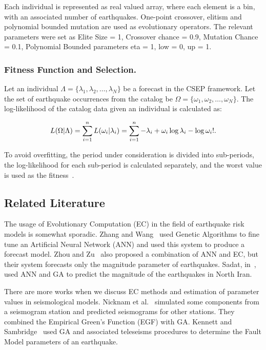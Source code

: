 Each individual is represented as real valued array, where each
element is a bin, with an associated number of earthquakes. One-point
crossover, elitism and polynomial bounded mutation are used as
evolutionary operators. The relevant parameters were set as Elite Size
= 1, Crossover chance = 0.9, Mutation Chance = 0.1, Polynomial Bounded
parameters eta = 1, low = 0, up = 1.


\subsubsection*{Fitness Function and Selection.}

Let an individual $\Lambda = \{\lambda_1, \lambda_2, \ldots,
\lambda_N\}$ be a forecast in the CSEP framework. Let the set of
earthquake occurrences from the catalog be $\Omega = \{\omega_1,
\omega_2, \ldots, \omega_N\}$. The log-likelihood of the catalog data
given an individual is calculated as:

\begin{equation}
L(\Omega|\Lambda) = \sum_{i=1}^{n}L(\omega_i|\lambda_i) \\ =
\sum_{i=1}^{n} -\lambda_i + \omega_i\log\lambda_i - \log\omega_i! .
\end{equation}

To avoid overfitting, the period under consideration is divided into
sub-periods, the log-likelihood for each sub-period is calculated
separately, and the worst value is used as the fitness~\cite{ecta14}.

\subsection{Related Literature}

The usage of Evolutionary Computation (EC) in the field of earthquake
risk models is somewhat sporadic. Zhang and Wang~\cite{Zhang2012} used
Genetic Algorithms to fine tune an Artificial Neural Network (ANN) and
used this system to produce a forecast model. Zhou and
Zu~\cite{Feiyan2014} also proposed a combination of ANN and EC, but
their system forecasts only the magnitude parameter of
earthquakes. Sadat, in~\cite{sadat2015application}, used ANN and GA to
predict the magnitude of the earthquakes in North Iran.

There are more works when we discuss EC methods and estimation of
parameter values in seismological models. Nicknam et
al.~\cite{Nicknam2010} simulated some components from a seismogram
station and predicted seismograms for other stations. They combined
the Empirical Green’s Function (EGF) with GA. Kennett and
Sambridge~\cite{Kennett1992} used GA and associated teleseisms
procedures to determine the Fault Model parameters of an
earthquake.

